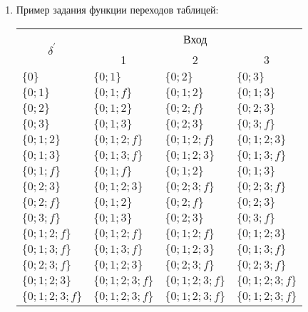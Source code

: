 \begin{enumerate}[label=(\roman{*})]
	\item Пример задания функции переходов таблицей:\\
		\begin{tabular}{llll}
		\toprule
		\multicolumn{1}{c}{\multirow{2}{*}{\Large $\delta^\prime$}}
			& \multicolumn{3}{c}{Вход} \\
		\cmidrule(rl){2-4}
			& \multicolumn{1}{c}{1}
				& \multicolumn{1}{c}{2}
				& \multicolumn{1}{c}{3} \\
		\midrule
		$\{0\}$         & $\{0;1\}$       & $\{0;2\}$       & $\{0;3\}$       \\
		$\{0;1\}$       & $\{0;1;f\}$     & $\{0;1;2\}$     & $\{0;1;3\}$     \\
		$\{0;2\}$       & $\{0;1;2\}$     & $\{0;2;f\}$     & $\{0;2;3\}$     \\
		$\{0;3\}$       & $\{0;1;3\}$     & $\{0;2;3\}$     & $\{0;3;f\}$     \\
		$\{0;1;2\}$     & $\{0;1;2;f\}$   & $\{0;1;2;f\}$   & $\{0;1;2;3\}$   \\
		$\{0;1;3\}$     & $\{0;1;3;f\}$   & $\{0;1;2;3\}$   & $\{0;1;3;f\}$   \\
		$\{0;1;f\}$     & $\{0;1;f\}$     & $\{0;1;2\}$     & $\{0;1;3\}$     \\
		$\{0;2;3\}$     & $\{0;1;2;3\}$   & $\{0;2;3;f\}$   & $\{0;2;3;f\}$   \\
		$\{0;2;f\}$     & $\{0;1;2\}$     & $\{0;2;f\}$     & $\{0;2;3\}$     \\
		$\{0;3;f\}$     & $\{0;1;3\}$     & $\{0;2;3\}$     & $\{0;3;f\}$     \\
		$\{0;1;2;f\}$   & $\{0;1;2;f\}$   & $\{0;1;2;f\}$   & $\{0;1;2;3\}$   \\
		$\{0;1;3;f\}$   & $\{0;1;3;f\}$   & $\{0;1;2;3\}$   & $\{0;1;3;f\}$   \\
		$\{0;2;3;f\}$   & $\{0;1;2;3\}$   & $\{0;2;3;f\}$   & $\{0;2;3;f\}$   \\
		$\{0;1;2;3\}$   & $\{0;1;2;3;f\}$ & $\{0;1;2;3;f\}$ & $\{0;1;2;3;f\}$ \\
		$\{0;1;2;3;f\}$ & $\{0;1;2;3;f\}$ & $\{0;1;2;3;f\}$ & $\{0;1;2;3;f\}$ \\ \bottomrule
		\end{tabular}
\end{enumerate}

